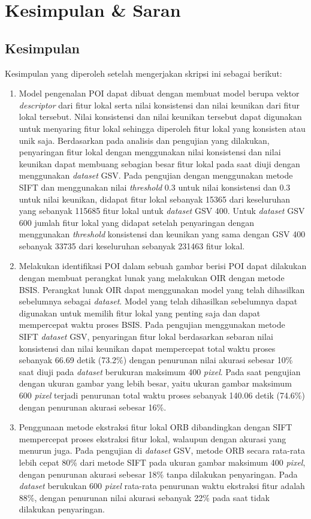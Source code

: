 \chapter{Kesimpulan \& Saran}
\label{chap:kesimpulan_saran}

\section{Kesimpulan}
Kesimpulan yang diperoleh setelah mengerjakan skripsi ini sebagai berikut:
\begin{enumerate}
	\item Model pengenalan POI dapat dibuat dengan membuat model berupa vektor \textit{descriptor} dari fitur lokal serta nilai konsistensi dan nilai keunikan dari fitur lokal tersebut. Nilai konsistensi dan nilai keunikan tersebut dapat digunakan untuk menyaring fitur lokal sehingga diperoleh fitur lokal yang konsisten atau unik saja. Berdasarkan pada analisis dan pengujian yang dilakukan, penyaringan fitur lokal dengan menggunakan nilai konsistensi dan nilai keunikan dapat membuang sebagian besar fitur lokal pada saat diuji dengan menggunakan \textit{dataset} GSV. Pada pengujian dengan menggunakan metode SIFT dan menggunakan nilai \textit{threshold} 0.3 untuk nilai konsistensi dan 0.3 untuk nilai keunikan, didapat fitur lokal sebanyak 15365 dari keseluruhan yang sebanyak 115685 fitur lokal untuk \textit{dataset} GSV 400. Untuk \textit{dataset} GSV 600 jumlah fitur lokal yang didapat setelah penyaringan dengan menggunakan \textit{threshold} konsistensi dan keunikan yang sama dengan GSV 400 sebanyak 33735 dari keseluruhan sebanyak 231463 fitur lokal.
	\item Melakukan identifikasi POI dalam sebuah gambar berisi POI dapat dilakukan dengan membuat perangkat lunak yang melakukan OIR dengan metode BSIS. Perangkat lunak OIR dapat menggunakan model yang telah dihasilkan sebelumnya sebagai \textit{dataset}. Model yang telah dihasilkan sebelumnya dapat digunakan untuk memilih fitur lokal yang penting saja dan dapat mempercepat waktu proses BSIS. Pada pengujian menggunakan metode SIFT \textit{dataset} GSV, penyaringan fitur lokal berdasarkan sebaran nilai konsistensi dan nilai keunikan dapat mempercepat total waktu proses sebanyak 66.69 detik (73.2\%) dengan penurunan nilai akurasi sebesar 10\% saat diuji pada \textit{dataset} berukuran maksimum 400 \textit{pixel}. Pada saat pengujian dengan ukuran gambar yang lebih besar, yaitu ukuran gambar maksimum 600 \textit{pixel} terjadi penurunan total waktu proses sebanyak 140.06 detik (74.6\%) dengan penurunan akurasi sebesar 16\%.
	\item Penggunaan metode ekstraksi fitur lokal ORB dibandingkan dengan SIFT mempercepat proses ekstraksi fitur lokal, walaupun dengan akurasi yang menurun juga. Pada pengujian di \textit{dataset} GSV, metode ORB secara rata-rata lebih cepat 80\% dari metode SIFT pada ukuran gambar maksimum 400 \textit{pixel}, dengan penurunan akurasi sebesar 18\% tanpa dilakukan penyaringan. Pada \textit{dataset} berukukan 600 \textit{pixel} rata-rata penurunan waktu ekstraksi fitur adalah 88\%, dengan penurunan nilai akurasi sebanyak 22\% pada saat tidak dilakukan penyaringan.
\end{enumerate}

